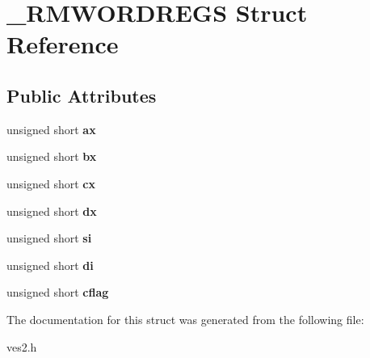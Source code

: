 \section{\-\_\-\-R\-M\-W\-O\-R\-D\-R\-E\-G\-S Struct Reference}
\label{struct__RMWORDREGS}
\subsection*{Public Attributes}
\begin{DoxyCompactItemize}
\item 
unsigned short {\bfseries ax}\label{struct__RMWORDREGS_a5976b8484e0cce514fdd328462b1daab}

\item 
unsigned short {\bfseries bx}\label{struct__RMWORDREGS_a6f576093c5137c4146fc92c5044b8c53}

\item 
unsigned short {\bfseries cx}\label{struct__RMWORDREGS_a6bf5f5483acea7e6e884d36fbb455170}

\item 
unsigned short {\bfseries dx}\label{struct__RMWORDREGS_a9ec61d4f99994219f687fc5ba90e4be1}

\item 
unsigned short {\bfseries si}\label{struct__RMWORDREGS_a7104c31444e5ca1f044fefbe9e7fe8de}

\item 
unsigned short {\bfseries di}\label{struct__RMWORDREGS_a6c858da25708e578a5743fd58af2c549}

\item 
unsigned short {\bfseries cflag}\label{struct__RMWORDREGS_acaf827ddb88468117c67a795cfeec688}

\end{DoxyCompactItemize}


The documentation for this struct was generated from the following file\-:\begin{DoxyCompactItemize}
\item 
ves2.\-h\end{DoxyCompactItemize}
